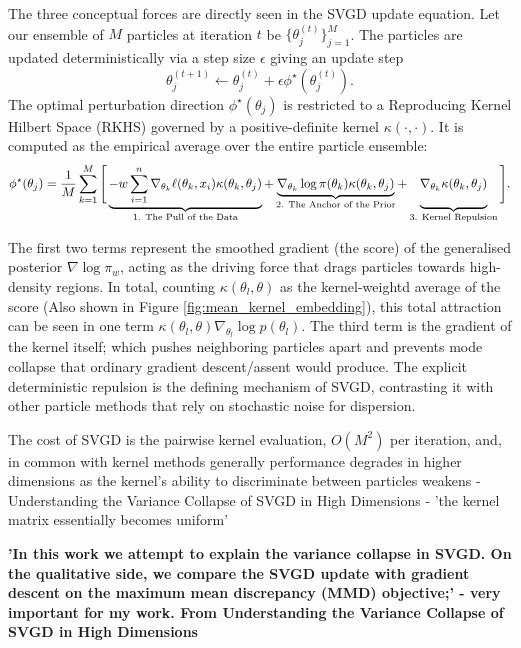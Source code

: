 \documentclass[11pt,a4paper]{article}
\newcommand{\add}[1]{{\color{red}#1}}
\begin{document}
The three conceptual forces are directly seen in the SVGD update equation. Let our ensemble of $M$ particles at iteration $t$ be $\{\theta_j^{(t)}\}_{j=1}^M$. The particles are updated deterministically via a step size $\epsilon$ giving an update step
\begin{equation}
    \theta_j^{(t+1)} \leftarrow \theta_j^{(t)} + \epsilon  \phi^\star(\theta_j^{(t)}).
\end{equation}
The optimal perturbation direction $\phi^\star(\theta_j)$ is restricted to a Reproducing Kernel Hilbert Space (RKHS) governed by a positive-definite kernel $\kappa(\cdot, \cdot)$. It is computed as the empirical average over the entire particle ensemble:
\begin{equation}
    \phi^\star(\theta_j) = \frac{1}{M} \sum_{k=1}^M \Bigg[ \underbrace{- w \sum_{i=1}^n \nabla_{\theta_k} \ell(\theta_k, x_i)  \kappa(\theta_k, \theta_j)}_{\text{1. The Pull of the Data}} + \underbrace{\nabla_{\theta_k} \log \pi(\theta_k)  \kappa(\theta_k, \theta_j)}_{\text{2. The Anchor of the Prior}} + \underbrace{\vphantom{\sum_{i=1}^n} \nabla_{\theta_k} \kappa(\theta_k, \theta_j)}_{\text{3. Kernel Repulsion}} \Bigg].
\end{equation}

The first two terms represent the smoothed gradient (the score) of the generalised posterior $\nabla \log \pi_w$, acting as the driving force that drags particles towards high-density regions. In total, counting $\kappa(\theta_l, \theta)$ as the kernel-weightd average of the score (Also shown in Figure \ref{fig:mean_kernel_embedding}), this total attraction can be seen in one term $\kappa(\theta_l,\theta)\nabla_{\theta_l}\log p(\theta_l)$. The third term is the gradient of the kernel itself; which pushes neighboring particles apart and prevents mode collapse that ordinary gradient descent/assent would produce. \add{The explicit deterministic repulsion is the defining mechanism of SVGD, contrasting it with other particle methods that rely on stochastic noise for dispersion.}

The cost of SVGD is the pairwise kernel evaluation, $O(M^2)$ per iteration, and, \add{in common with kernel methods generally performance degrades in higher dimensions as the kernel's ability to discriminate between particles weakens - Understanding the Variance Collapse of SVGD in High Dimensions - 'the kernel matrix essentially becomes uniform'}


\textbf{\add{'In this work we attempt to explain the variance collapse in SVGD. On the qualitative side, we compare the SVGD update with gradient descent on the maximum mean discrepancy (MMD) objective;' - very important for my work. From  Understanding the Variance Collapse of SVGD in High Dimensions }}
\end{document}
